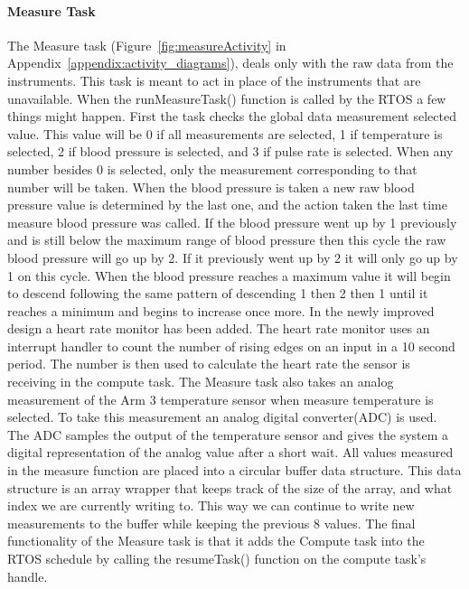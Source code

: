 \documentclass[12pt]{article} %
\begin{document}
\paragraph{Measure Task} The Measure task (Figure~\ref{fig:measureActivity}
in Appendix~\ref{appendix:activity_diagrams}), deals only with the raw data from the
instruments. This task is meant to act in place of the instruments that are
unavailable.  When the runMeasureTask() function is called by the RTOS a few things might happen. First the task checks the global data measurement selected value. 
This value will be 0 if all measurements are selected, 1 if temperature is selected, 2 if blood pressure is selected, and 3 if pulse rate is selected. 
When any number besides 0 is selected, only the measurement corresponding to that number will be taken.
When the blood pressure is taken a new raw blood pressure value is determined by the last one, and the action taken the last time measure blood pressure was called.
If the blood pressure went up by 1 previously and is still below the maximum range of blood pressure then this cycle the raw blood pressure will go up by 2. If it previously went up by 2 it will only go up by 1 on this cycle.
When the blood pressure reaches a maximum value it will begin to descend following the same pattern of descending 1 then 2 then 1 until it reaches a minimum and begins to increase once more.
In the newly improved design a heart rate monitor has been added.
The heart rate monitor uses an interrupt handler to count the number of
rising edges on an input in a 10 second period. The number is then used
to calculate the heart rate the sensor is receiving in the compute task. 
The Measure task also takes an analog measurement of the Arm 3 temperature sensor when measure temperature is selected.
To take this measurement an analog digital converter(ADC) is used. The ADC samples the output of the temperature sensor and gives the system a digital representation of the analog value after a short wait.
All values measured in the measure function are placed into a circular buffer data structure. This data structure is an array wrapper that keeps track of the size of the array, and what index we are currently
writing to. This way we can continue to write new measurements to the buffer while keeping the previous 8 values.
The final functionality of the Measure task is that it adds the Compute task into the RTOS schedule by calling the resumeTask() function on the compute task's handle.
\end{document}
